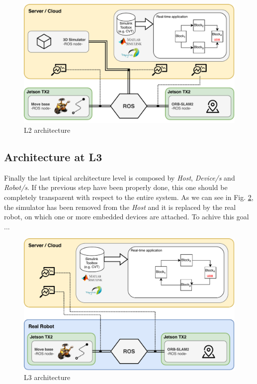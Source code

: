 \begin{figure}
	\centering
	\includegraphics[width=\textwidth]{images/L2-arch}
	\caption{L2 architecture}
	\label{fig:l2arch}
\end{figure}




\subsection{Architecture at L3}	%
Finally the last tipical architecture level is composed by \textit{Host}, \textit{Device/s } and  \textit{Robot/s}. If the previous step have been properly done, this one should be completely 
transparent with respect to the entire system. 
As we can see in Fig. \ref{fig:l3arch}, the simulator has been removed from the \textit{Host} and it is replaced by the real robot, on which one or more embedded devices are attached.
To achive this goal ... 


\begin{figure}
	\centering
	\includegraphics[width=\textwidth]{images/L3-arch}
	\caption{L3 architecture}
	\label{fig:l3arch}
\end{figure}


